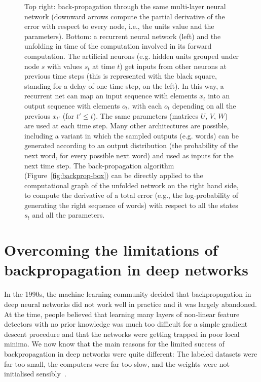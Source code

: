 \documentclass[10pts]{article}
\begin{document}
\begin{figure}[ht]
{\begin{minipage}{\textwidth}
{Top right: back-propagation through the same multi-layer neural network
(downward arrows compute the partial derivative of the error with respect
to every node, i.e., the units value and the parameters).\newline
Bottom: a recurrent neural network (left) and the unfolding in time of the
computation involved in its forward computation. The artificial neurons
(e.g. hidden units grouped under node $s$ with values $s_t$ at time $t$) 
get inputs from other neurons at previous time steps
(this is represented with the black square, standing for a delay of
one time step, on the left). In this way, a recurrent net can map an input sequence
with elements $x_t$ into an output sequence with elements $o_t$, with
each $o_t$ depending on all the previous $x_{t'}$ (for $t'\leq t$). The
same parameters (matrices $U$, $V$, $W$) are used at each time step.
Many other architectures are possible, including a variant in which
the sampled outputs (e.g. words) can be generated according to an output 
distribution (the probability of the next word, for every possible next word) 
and used as inputs for the next time step.
The back-propagation algorithm (Figure~\ref{fig:backprop-box})
can be directly applied to the computational graph of the unfolded network
on the right hand side, to compute the derivative of a total error
(e.g., the log-probability of generating the right sequence of
words) with respect to all the states $s_t$ and all the parameters.
}
\label{fig:mlp}
\end{minipage}
}
\end{figure}

\section{Overcoming the limitations of backpropagation in deep networks}

In the 1990s, the machine learning community decided that backpropagation
in deep neural networks did not work well in practice and it was largely
abandoned.  At the time, people believed that learning many layers of
non-linear feature detectors with no prior knowledge was much too difficult
for a simple gradient descent procedure and that the networks were getting
trapped in poor local minima. We now know that the main reasons for the
limited success of backpropagation in deep networks were quite different:
The labeled datasets were far too small, the computers were far too slow,
and the weights were not initialised sensibly~\citep{GlorotAISTATS2010-small}.
\end{document}
